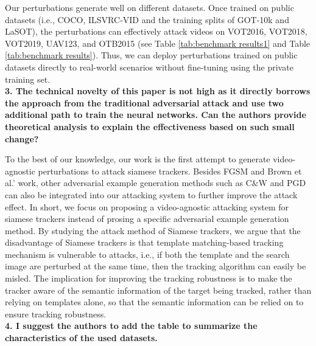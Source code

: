 \documentclass{article}
\begin{document}
Our perturbations generate well on different datasets. Once trained on public datasets (i.e., COCO, ILSVRC-VID and the training splits of GOT-10k and LaSOT), the perturbations can effectively attack videos on VOT2016, VOT2018, VOT2019, UAV123, and OTB2015 (see Table \ref{tab:benchmark results1} and Table \ref{tab:benchmark results}). Thus, we can deploy perturbations trained on public datasets directly to real-world scenarios without fine-tuning using the private training set.
\\[6pt]
\noindent \textbf{3. The technical novelty of this paper is not high as it directly borrows the approach from the traditional adversarial attack and use two additional path to train the neural networks. Can the authors provide theoretical analysis to explain the effectiveness based on such small change?}

To the best of our knowledge, our work is the first attempt to generate video-agnostic perturbations to attack siamese trackers. Besides FGSM and Brown et al.' work, other adversarial example generation methods such as C\&W \cite{carlini2017towards} and PGD \cite{PGD} can also be integrated into our attacking system to further improve the attack effect.
In short, we focus on proposing a video-agnostic attacking system for siamese trackers instead of prosing a specific adversarial example generation method.
By studying the attack method of Siamese trackers, we argue that the disadvantage of Siamese trackers is that template matching-based tracking mechanism is vulnerable to attacks, i.e., if both the template and the search image are perturbed at the same time, then the tracking algorithm can easily be misled.
The implication for improving the tracking robustness is to make the tracker aware of the semantic information of the target being tracked, rather than relying on templates alone, so that the semantic information can be relied on to ensure tracking robustness.
\\[6pt]
\noindent \textbf{4. I suggest the authors to add the table to summarize the characteristics of the used datasets.}
\end{document}
